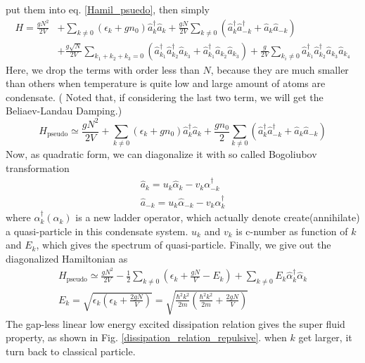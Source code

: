 put them into eq. \ref{Hamil_psuedo}, then simply
\begin{equation}
\begin{split}
H=\frac{g N^2}{2V}&+\sum_{k\neq0}\left(\epsilon_k+gn_0\right)\hat{a}_k^\dagger\hat{a}_k+\frac{gN}{2V}\sum_{k\neq0}\left(\hat{a}_k^\dagger\hat{a}_{-k}^\dagger+\hat{a}_k\hat{a}_{-k}\right)\\
&+\frac{g\sqrt{N}}{2V}\sum_{k_1+k_2+k_3=0}\left(\hat{a}_{k_1}^\dagger\hat{a}_{k_2}^\dagger\hat{a}_{k_3}+\hat{a}_{k_1}^\dagger\hat{a}_{k_2}\hat{a}_{k_3}\right)+\frac{g}{2V}\sum_{k_i\neq0}\hat{a}_{k_1}^\dagger\hat{a}_{k_2}^\dagger\hat{a}_{k_3}\hat{a}_{k_4}
\end{split}
\end{equation}
Here, we drop the terms with order less than $N$, because they are much smaller than others when temperature is quite low and  large amount of atoms are condensate. ( Noted that, if considering the last two term, we will get the Beliaev-Landau Damping.)
\begin{equation}
H_{\text{pseudo}}\simeq\frac{gN^2}{2V}+\sum_{k\neq0}\left(\epsilon _k+g n_0\right)\hat{a}_k^\dagger\hat{a}_k+\frac{gn_0}{2}\sum_{k\neq0}\left(\hat{a}_k^\dagger\hat{a}_{-k}^\dagger+\hat{a}_k\hat{a}_{-k}\right)\end{equation}
Now, as quadratic form, we can diagonalize it with so called Bogoliubov transformation
\begin{equation}
\begin{split}
\hat{a}_k=u_k\hat{\alpha }_k-v_k\alpha _{-k}^\dagger\\
\hat{a}_{-k}=u_k\hat{\alpha }_{-k}-v_k\alpha _k^\dagger
\end{split}
\end{equation}
where $\alpha _k^\dagger\left(\alpha _k\right)$ is a new ladder operator, which actually denote create(annihilate) a quasi-particle in this condensate system. $u_k$ and $v_k$ is c-number as function of $k$ and $E_k$, which gives the spectrum of quasi-particle. 
Finally, we give out the diagonalized Hamiltonian as
\begin{equation}
\label{Hamil_psuedo_dia}
\begin{split}
H_{\text{pseudo}}\simeq \frac{g N^2}{2V}-\frac{1}{2}\sum _{k\neq 0} \left(\epsilon _k+\frac{g N}{V}-E_k\right)+\sum _{k\neq 0} E_k\hat{\alpha }_k^\dagger\hat{\alpha
}_k\\
E_k=\sqrt{\epsilon _k\left(\epsilon _k+\frac{2 g N}{V}\right)}=\sqrt{\frac{\hbar ^2k^2}{2m}\left(\frac{\hbar ^2k^2}{2m}+\frac{2 g N}{V}\right)}
\end{split}
\end{equation}
The gap-less linear low energy excited dissipation relation gives the super fluid property, as shown in Fig. \ref{dissipation_relation_repulsive}. when $k$ get larger, it turn back to classical particle. 

